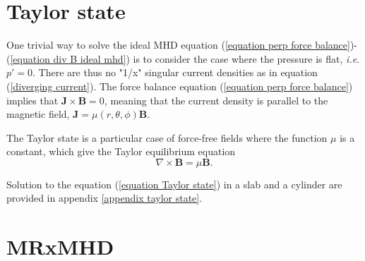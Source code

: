 \documentclass[my_thesis.tex]{subfiles}
\begin{document}
\section{Taylor state}
\label{section taylor state}
One trivial way to solve the ideal MHD equation (\ref{equation perp force balance})-(\ref{equation div B ideal mhd}) is to consider the case where the pressure is flat, \textit{i.e.} $p'=0$. There are thus no "1/x" singular current densities as in equation (\ref{diverging current}). The force balance equation (\ref{equation perp force balance}) implies that $\mathbf{J}\times\mathbf{B}=0$, meaning that the current density is parallel to the magnetic field, $\mathbf{J}=\mu(r,\theta,\phi)\mathbf{B}$.

The Taylor state \citep{Taylor1974,Taylor1986} is a particular case of force-free fields where the function $\mu$ is a constant, which give the Taylor equilibrium equation
\begin{equation}
	\nabla\times\mathbf{B}=\mu\mathbf{B}. \label{equation Taylor state}
\end{equation}

Solution to the equation (\ref{equation Taylor state}) in a slab and a cylinder are provided in appendix \ref{appendix taylor state}.


\section{MRxMHD}
\label{section mrxmhd}
\end{document}
